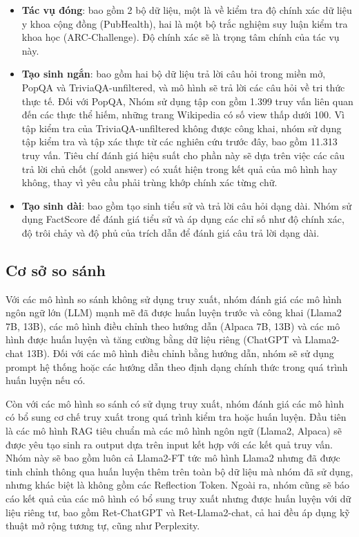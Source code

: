 \documentclass{article}
\begin{document}
\begin{itemize}
    \item \textbf{Tác vụ đóng}: bao gồm 2 bộ dữ liệu, một là về kiểm tra độ chính xác dữ liệu y khoa cộng đồng (PubHealth), hai là một bộ trắc nghiệm suy luận kiểm tra khoa học (ARC-Challenge). Độ chính xác sẽ là trọng tâm chính của tác vụ này. 
    \item \textbf{Tạo sinh ngắn}: bao gồm hai bộ dữ liệu trả lời câu hỏi trong miền mở, PopQA và TriviaQA-unfiltered, và mô hình sẽ trả lời các câu hỏi về tri thức thực tế. Đối với PopQA, Nhóm sử dụng tập con gồm 1.399 truy vấn liên quan đến các thực thể hiếm, những trang Wikipedia có số view thấp dưới 100. Vì tập kiểm tra của TriviaQA-unfiltered không được công khai, nhóm sử dụng tập kiểm tra và tập xác thực từ các nghiên cứu trước đây, bao gồm 11.313 truy vấn. Tiêu chí đánh giá hiệu suất cho phần này sẽ dựa trên việc các câu trả lời chủ chốt (gold answer) có xuất hiện trong kết quả của mô hình hay không, thay vì yêu cầu phải trùng khớp chính xác từng chữ.
    \item \textbf{Tạo sinh dài}: bao gồm tạo sinh tiểu sử và trả lời câu hỏi dạng dài. Nhóm sử dụng FactScore để đánh giá tiểu sử và áp dụng các chỉ số như độ chính xác, độ trôi chảy và độ phủ của trích dẫn để đánh giá câu trả lời dạng dài.
\end{itemize}

\subsection{Cơ sở so sánh}
Với các mô hình so sánh không sử dụng truy xuất, nhóm đánh giá các mô hình ngôn ngữ lớn (LLM) mạnh mẽ đã được huấn luyện trước và công khai (Llama2 7B, 13B), các mô hình điều chỉnh theo hướng dẫn (Alpaca 7B, 13B) và các mô hình được huấn luyện và tăng cường bằng dữ liệu riêng (ChatGPT và Llama2-chat 13B). Đối với các mô hình điều chỉnh bằng hướng dẫn, nhóm sẽ sử dụng prompt hệ thống hoặc các hướng dẫn theo định dạng chính thức trong quá trình huấn luyện nếu có.

Còn với các mô hình so sánh có sử dụng truy xuất, nhóm đánh giá các mô hình có bổ sung cơ chế truy xuất trong quá trình kiểm tra hoặc huấn luyện. Đầu tiên là các mô hình RAG tiêu chuẩn mà các mô hình ngôn ngữ (Llama2, Alpaca) sẽ được yêu tạo sinh ra output dựa trên input kết hợp với các kết quả truy vấn. Nhóm này sẽ bao gồm luôn cả Llama2-FT tức mô hình Llama2 nhưng đã được tinh chỉnh thông qua huấn luyện thêm trên toàn bộ dữ liệu mà nhóm đã sử dụng, nhưng khác biệt là không gồm các Reflection Token. Ngoài ra, nhóm cũng sẽ báo cáo kết quả của các mô hình có bổ sung truy xuất nhưng được huấn luyện với dữ liệu riêng tư, bao gồm Ret-ChatGPT và Ret-Llama2-chat, cả hai đều áp dụng kỹ thuật mở rộng tương tự, cũng như Perplexity. 
\end{document}
